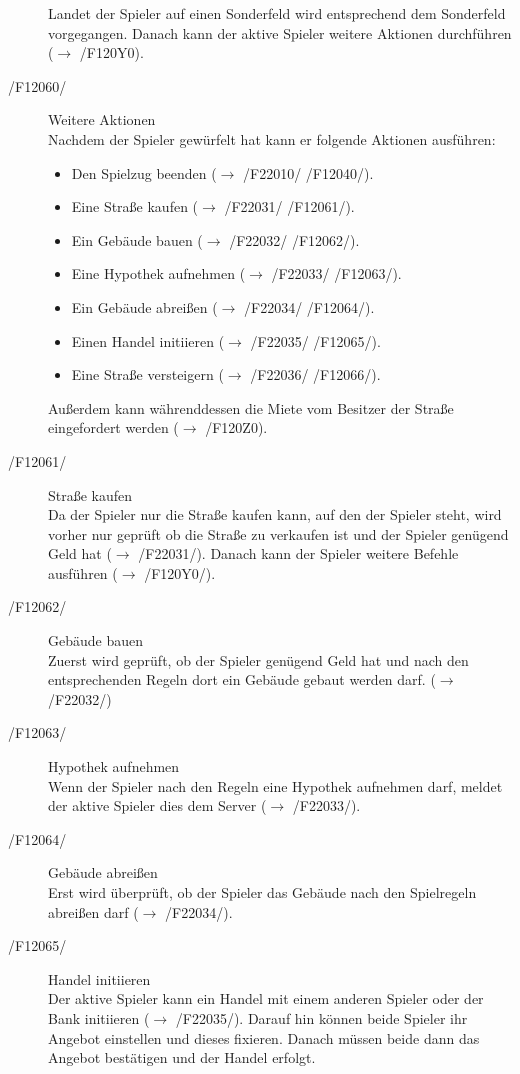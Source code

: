 \documentclass[a4paper,10pt]{article}
\begin{document}
\begin{description}
Landet der Spieler auf einen Sonderfeld wird entsprechend dem Sonderfeld vorgegangen. Danach kann der aktive Spieler weitere Aktionen durchführen ($\rightarrow$ /F120Y0).
\item[/F12060/] Weitere Aktionen \\
Nachdem der Spieler gewürfelt hat kann er folgende Aktionen ausführen:
\begin{itemize}
\item Den Spielzug beenden ($\rightarrow$ /F22010/ /F12040/).
\item Eine Straße kaufen ($\rightarrow$ /F22031/ /F12061/).
\item Ein Gebäude bauen ($\rightarrow$ /F22032/ /F12062/).
\item Eine Hypothek aufnehmen ($\rightarrow$ /F22033/ /F12063/).
\item Ein Gebäude abreißen ($\rightarrow$ /F22034/ /F12064/).
\item Einen Handel initiieren ($\rightarrow$ /F22035/ /F12065/).
\item Eine Straße versteigern ($\rightarrow$ /F22036/ /F12066/).
\end{itemize}
Außerdem kann währenddessen die Miete vom Besitzer der Straße eingefordert werden ($\rightarrow$ /F120Z0).
\item[/F12061/] Straße kaufen \\
Da der Spieler nur die Straße kaufen kann, auf den der Spieler steht, wird vorher nur geprüft ob die Straße zu verkaufen ist und der Spieler genügend Geld hat ($\rightarrow$ /F22031/). Danach kann der Spieler weitere Befehle ausführen ($\rightarrow$ /F120Y0/).
\item[/F12062/] Gebäude bauen \\
Zuerst wird geprüft, ob der Spieler genügend Geld hat und nach den entsprechenden Regeln dort ein Gebäude gebaut werden darf. ($\rightarrow$ /F22032/)
\item[/F12063/] Hypothek aufnehmen \\
Wenn der Spieler nach den Regeln eine Hypothek aufnehmen darf, meldet der aktive Spieler dies dem Server ($\rightarrow$ /F22033/).
\item[/F12064/] Gebäude abreißen \\
Erst wird überprüft, ob der Spieler das Gebäude nach den Spielregeln abreißen darf ($\rightarrow$ /F22034/).
\item[/F12065/] Handel initiieren \\
Der aktive Spieler kann ein Handel mit einem anderen Spieler oder der Bank initiieren ($\rightarrow$ /F22035/). Darauf hin können beide Spieler ihr Angebot einstellen und dieses fixieren. Danach müssen beide dann das Angebot bestätigen und der Handel erfolgt.

\end{description}
\end{document}
